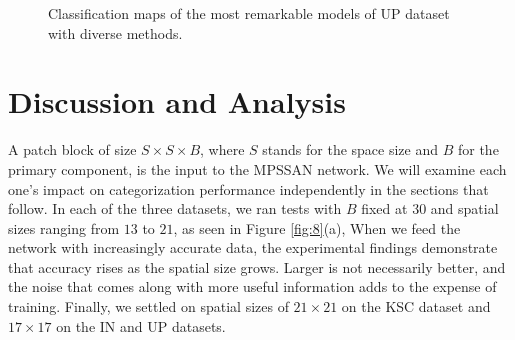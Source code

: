 \documentclass[]{interact}
\theoremstyle{plain}%
\theoremstyle{definition}
\theoremstyle{remark}
\begin{document}
\begin{figure}[!htb]
{\begin{minipage}[t]{0.14\textwidth}
\end{minipage}
}
\caption{Classification maps of the most remarkable models of UP dataset with diverse methods.}\label{fig:7}
\end{figure}

\section{Discussion and Analysis}
A patch block of size $S\times S\times B$, where $S$ stands for the space size and $B$ for the primary component, is the input to the MPSSAN network. We will examine each one's impact on categorization performance independently in the sections that follow. In each of the three datasets, we ran tests with $B$ fixed at $30$ and spatial sizes ranging from $13$ to $21$, as seen in Figure \ref{fig:8}(a), When we feed the network with increasingly accurate data, the experimental findings demonstrate that accuracy rises as the spatial size grows. Larger is not necessarily better, and the noise that comes along with more useful information adds to the expense of training. Finally, we settled on spatial sizes of $21\times 21$ on the KSC dataset and $17\times 17$ on the IN and UP datasets.
\end{document}
